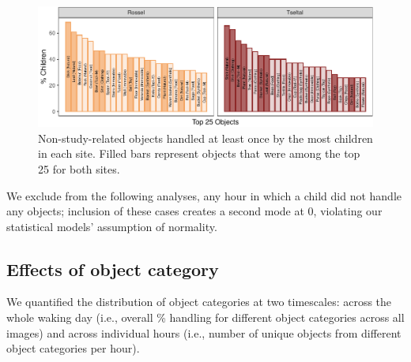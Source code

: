 \documentclass[10pt, letterpaper]{article}
\newenvironment{CodeChunk}{}{}
\begin{document}
\begin{CodeChunk}
\begin{figure}[!ht]

{\centering \includegraphics{figs/top-objects-fig-1} 

}

\caption[Non-study-related objects handled at least once by the most children in each site]{Non-study-related objects handled at least once by the most children in each site. Filled bars represent objects that were among the top 25 for both sites.}\label{fig:top-objects-fig}
\end{figure}
\end{CodeChunk}

We exclude from the following analyses, any hour in which a child did
not handle any objects; inclusion of these cases creates a second mode
at 0, violating our statistical models' assumption of normality.

\hypertarget{effects-of-object-category}{%
\subsection{Effects of object
category}\label{effects-of-object-category}}

We quantified the distribution of object categories at two timescales:
across the whole waking day (i.e., overall \% handling for different
object categories across all images) and across individual hours (i.e.,
number of unique objects from different object categories per hour).
\end{document}
